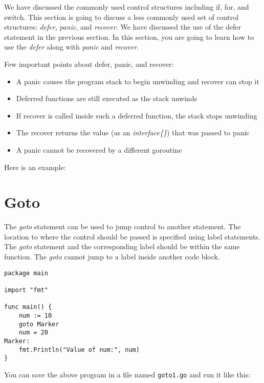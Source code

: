 We have discussed the commonly used control structures including if,
for, and switch.  This section is going to discuss a less commonly
used set of control structures: \textit{defer}, \textit{panic},
and \textit{recover}.  We have discussed the use of the defer
statement in the previous section. In this section, you are going to
learn how to use the \textit{defer} along with \textit{panic}
and \textit{recover}.

Few important points about defer, panic, and recover:

\begin{itemize}
\item A panic causes the program stack to begin unwinding and recover can stop it
\item Deferred functions are still executed as the stack unwinds
\item If recover is called inside such a deferred function, the stack stops unwinding
\item The recover returns the value (as an \textit{interface\{\}}) that was passed to panic
\item A panic cannot be recovered by a different goroutine
\end{itemize}

Here is an example:



\section{Goto}

The \textit{goto} statement can be used to jump control to
another statement.  The location to where the control should be passed
is specified using label statements.  The \textit{goto} statement and
the corresponding label should be within the same function.
The \textit{goto} cannot jump to a label inside another code block.

\begin{lstlisting}[caption=Goto example program (goto.go)]
package main

import "fmt"

func main() {
    num := 10
    goto Marker
    num = 20
Marker:
    fmt.Println("Value of num:", num)
}
\end{lstlisting}

You can save the above program in a file named \texttt{goto1.go} and
run it like this:

